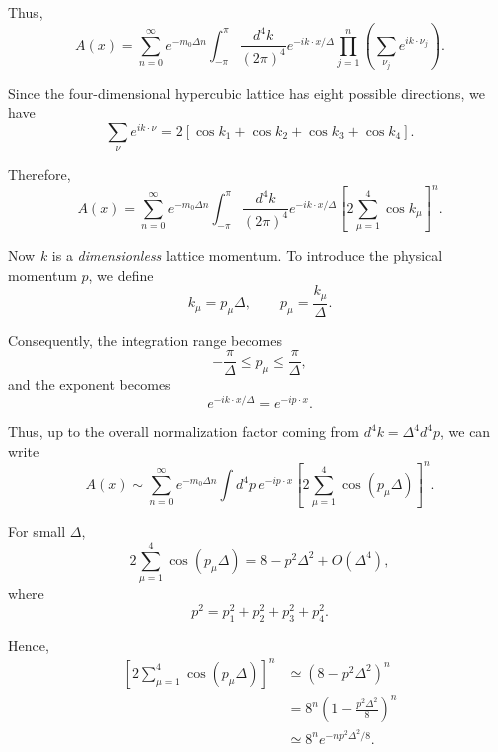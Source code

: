 \documentclass[12pt,a4paper]{article}
\begin{document}
Thus,
\begin{equation}
A(x)
=
\sum_{n=0}^{\infty}
e^{-m_0\Delta n}
\int_{-\pi}^{\pi}
\frac{d^4 k}{(2\pi)^4}
e^{-ik\cdot x/\Delta}
\prod_{j=1}^{n}
\left(
\sum_{\nu_j}e^{ik\cdot\nu_j}
\right).
\label{eq:fourier-k}
\end{equation}

Since the four-dimensional hypercubic lattice has eight possible directions,
we have
\begin{equation}
\sum_{\nu}e^{ik\cdot\nu}
=
2\left[
\cos k_1+\cos k_2+\cos k_3+\cos k_4
\right].
\label{eq:sumdirections}
\end{equation}

Therefore,
\begin{equation}
A(x)
=
\sum_{n=0}^{\infty}
e^{-m_0\Delta n}
\int_{-\pi}^{\pi}
\frac{d^4 k}{(2\pi)^4}
e^{-ik\cdot x/\Delta}
\left[
2\sum_{\mu=1}^{4}\cos k_\mu
\right]^n.
\label{eq:Ak}
\end{equation}

Now $k$ is a \emph{dimensionless} lattice momentum. To introduce the
physical momentum $p$, we define
\begin{equation}
k_\mu=p_\mu\Delta,
\qquad
p_\mu=\frac{k_\mu}{\Delta}.
\end{equation}

Consequently, the integration range becomes
\[
-\frac{\pi}{\Delta}\leq p_\mu\leq\frac{\pi}{\Delta},
\]
and the exponent becomes
\[
e^{-ik\cdot x/\Delta}=e^{-ip\cdot x}.
\]

Thus, up to the overall normalization factor coming from
$d^4k=\Delta^4d^4p$, we can write
\begin{equation}
A(x)
\sim
\sum_{n=0}^{\infty}
e^{-m_0\Delta n}
\int
d^4p\,
e^{-ip\cdot x}
\left[
2\sum_{\mu=1}^{4}\cos(p_\mu\Delta)
\right]^n.
\label{eq:Ap}
\end{equation}

For small $\Delta$,
\begin{equation}
2\sum_{\mu=1}^{4}\cos(p_\mu\Delta)
=
8-p^2\Delta^2+O(\Delta^4),
\end{equation}
where
\[
p^2=p_1^2+p_2^2+p_3^2+p_4^2.
\]

Hence,
\begin{align}
\left[
2\sum_{\mu=1}^{4}\cos(p_\mu\Delta)
\right]^n
&\simeq
\left(8-p^2\Delta^2\right)^n
\nonumber\\
&=
8^n
\left(
1-\frac{p^2\Delta^2}{8}
\right)^n
\nonumber\\
&\simeq
8^n
e^{-np^2\Delta^2/8}.
\label{eq:gaussian}
\end{align}
\end{document}
